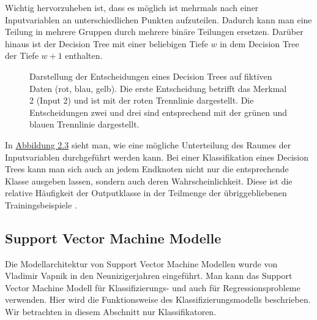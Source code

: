 Wichtig hervorzuheben ist, dass es m\"oglich ist mehrmals nach einer Inputvariablen an unterschiedlichen Punkten aufzuteilen.
Dadurch kann man eine Teilung in mehrere Gruppen durch mehrere bin\"are Teilungen ersetzen.
Dar\"uber hinaus ist der Decision Tree mit einer beliebigen Tiefe $w$ in dem Decision Tree der Tiefe $w + 1$ enthalten. \\

\begin{figure}[ht]
	\label{fig:rf2}
	\begin{center}
		\begin{tiny}
		\end{tiny}
	\end{center}
	\caption[Regression eines Random Forest Modells]
	{Darstellung der Entscheidungen eines Decision Trees auf fiktiven Daten (rot, blau, gelb). Die erste Entscheidung
		betrifft das Merkmal 2 (Input 2) und ist mit der roten Trennlinie dargestellt. Die Entscheidungen zwei und drei sind
		entsprechend mit der gr\"unen und blauen Trennlinie dargestellt.}
\end{figure}



In \hyperref[fig:rf2]{Abbildung 2.3} sieht man, wie eine m\"ogliche Unterteilung des
Raumes der Inputvariablen durchgef\"uhrt werden kann. Bei einer Klassifikation eines Decision Trees kann man sich auch an jedem Endknoten nicht nur die entsprechende Klasse
ausgeben lassen, sondern auch deren Wahrscheinlichkeit. Diese ist die relative H\"aufigkeit der Outputklasse in der Teilmenge der \"ubriggebliebenen Trainingsbeispiele \cite{sklearn}.  \\






























\subsection{Support Vector Machine Modelle}

Die Modellarchitektur von Support Vector Machine Modellen wurde von Vladimir Vapnik \cite{SVMVapnik} in den Neunizigerjahren eingef\"uhrt. Man kann das
Support Vector Machine Modell f\"ur Klassifizierungs- und auch f\"ur Regressionsprobleme verwenden. Hier wird die Funktionsweise des Klassifizierungsmodells
beschrieben. Wir betrachten in diesem Abschnitt nur Klassifikatoren. \\

